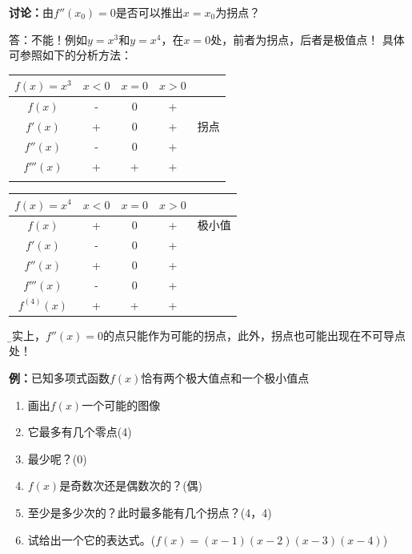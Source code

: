 {\bf 讨论：}由$f''(x_0)=0$是否可以推出$x=x_0$为拐点？

答：不能！例如$y=x^3$和$y=x^4$，在$x=0$处，前者为拐点，后者是极值点！
具体可参照如下的分析方法：
\begin{center}
\begin{tabular}{c||c|c|c|c}
	\hline 
	$f(x)=x^3$ & $x<0$ & $x=0$ & $x>0$ & \\ 
	\hline 
	$f(x)$ & - & 0 & + & \\ 
	\hline 
	$f'(x)$ & + & 0 & + & 拐点\\ 
	\hline 
	$f''(x)$ & - & 0 & + & \\ 
	\hline 
	$f'''(x)$ & + & + & + & \\ 
	\hline 
	 &  &  &  &  \\ 
	\hline 
\end{tabular} 
\begin{tabular}{c||c|c|c|c}
	\hline 
	$f(x)=x^4$ & $x<0$ & $x=0$ & $x>0$ & \\ 
	\hline 
	$f(x)$ & + & 0 & + & 极小值\\ 
	\hline 
	$f'(x)$ & - & 0 & + & \\ 
	\hline 
	$f''(x)$ & + & 0 & + & \\ 
	\hline 
	$f'''(x)$ & - & 0 & + & \\ 
	\hline 
	$f^{(4)}(x)$ & + & + & + & \\ 
	\hline 
\end{tabular} 
\end{center}

{\b 事实上，$f''(x)=0$的点只能作为可能的拐点，此外，拐点也可能出现在不可导点处！}

{\bf 例：}已知多项式函数$f(x)$恰有两个极大值点和一个极小值点
\begin{enumerate}[(1)]
  \setlength{\itemindent}{1cm}
  \item 画出$f(x)$一个可能的图像
  \item 它最多有几个零点\hfill(4)
  \item 最少呢？\hfill(0)
  \item $f(x)$是奇数次还是偶数次的？\hfill(偶)
  \item 至少是多少次的？此时最多能有几个拐点？\hfill(4，4)
  \item 试给出一个它的表达式。\hfill($f(x)=(x-1)(x-2)(x-3)(x-4)$)
\end{enumerate}

